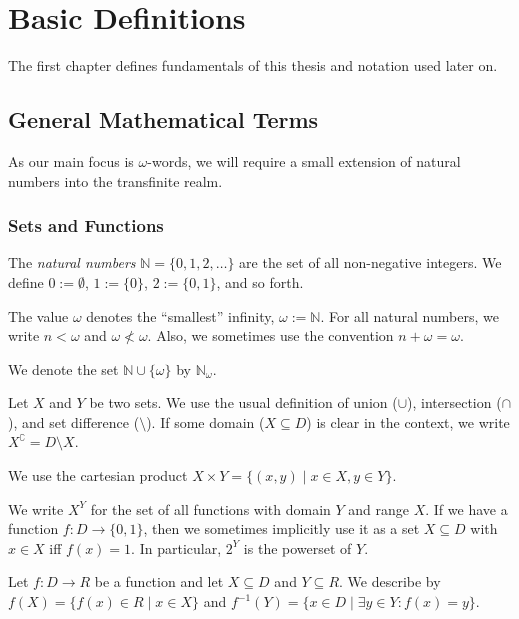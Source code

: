 \chapter{Basic Definitions}

The first chapter defines fundamentals of this thesis and notation used later on.

\section{General Mathematical Terms}
As our main focus is $\omega$-words, we will require a small extension of natural numbers into the transfinite realm.

\subsection{Sets and Functions}
\begin{defn}
	The \emph{natural numbers} $\mathbb{N} = \{0, 1, 2, \dots\}$ are the set of all non-negative integers. We define $0 := \emptyset$, $1 := \{0\}$, $2 := \{0, 1\}$, and so forth.
	
	The value $\omega$ denotes the \enquote{smallest} infinity, $\omega := \mathbb{N}$. For all natural numbers, we write $n < \omega$ and $\omega \not < \omega$. Also, we sometimes use the convention $n + \omega = \omega$.
	
	We denote the set $\mathbb{N} \cup \{\omega\}$ by $\mathbb{N}_\omega$.
\end{defn}

\begin{defn}
	Let $X$ and $Y$ be two sets. We use the usual definition of union ($\cup$), intersection ($\cap$), and set difference ($\setminus$). If some domain ($X \subseteq D$) is clear in the context, we write $X^\complement = D \setminus X$.
	
	We use the cartesian product $X \times Y = \{ (x, y) \mid x \in X, y \in Y \}$.
	
	We write $X^Y$ for the set of all functions with domain $Y$ and range $X$. If we have a function $f : D \rightarrow \{0, 1\}$, then we sometimes implicitly use it as a set $X \subseteq D$ with $x \in X$ iff $f(x) = 1$. In particular, $2^Y$ is the powerset of $Y$.
\end{defn}

\begin{defn}
	Let $f : D \rightarrow R$ be a function and let $X \subseteq D$ and $Y \subseteq R$. We describe by $f(X) = \{ f(x) \in R \mid x \in X\}$ and $f^{-1}(Y) = \{ x \in D \mid \exists y \in Y: f(x) = y \}$.
\end{defn}

